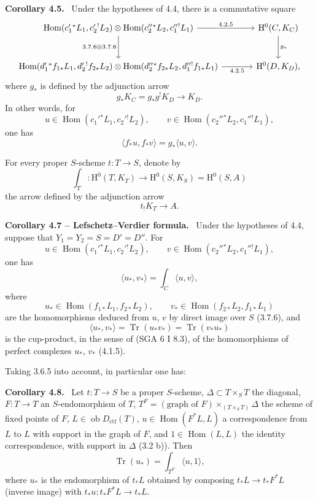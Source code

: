 \documentclass[11pt]{article}
\newenvironment{statement}[1]{\par\medskip\noindent\textbf{#1.}\ }{\par\medskip}
\renewcommand{\H}{\mathrm{H}}
\DeclareMathOperator{\Hom}{Hom}
\newcommand{\ob}{\operatorname{ob}}
\providecommand{\Dctf}{D_{\mathrm{ctf}}}
\providecommand{\Tr}{\operatorname{Tr}}
\providecommand{\Tr}{\operatorname{Tr}}
\providecommand{\Dctf}{D_{\mathrm{ctf}}}
\providecommand{\Tr}{\operatorname{Tr}}
\providecommand{\Hom}{\operatorname{Hom}}
\providecommand{\ob}{\operatorname{ob}}
\providecommand{\Tr}{\operatorname{Tr}}
\providecommand{\Hom}{\operatorname{Hom}}
\providecommand{\Tr}{\operatorname{Tr}}
\begin{document}
\begin{statement}{Corollary 4.5}
Under the hypotheses of 4.4, there is a commutative square
\[
\begin{tikzcd}[column sep=large,row sep=large]
\Hom(c_1'{}^*L_1,c_2'{}^!L_2)\otimes
\Hom(c_2''{}^*L_2,c_1''{}^!L_1)
 \arrow[r,"4.2.5"] \arrow[d,"3.7.6\otimes 3.7.6"'] &
\H^0(C,K_C)\arrow[d,"g_*"]\\
\Hom(d_1'{}^*f_{1*}L_1,d_2'{}^!f_{2*}L_2)\otimes
\Hom(d_2''{}^*f_{2*}L_2,d_1''{}^!f_{1*}L_1)
 \arrow[r,"4.2.5"'] &
\H^0(D,K_D),
\end{tikzcd}
\]
where $g_*$ is defined by the adjunction arrow
\[
g_*K_C=g_*g^!K_D\longrightarrow K_D.
\]
In other words, for
\[
u\in\Hom(c_1'{}^*L_1,c_2'{}^!L_2),\qquad
v\in\Hom(c_2''{}^*L_2,c_1''{}^!L_1),
\]
one has
\begin{equation}
\tag{4.5.1}
\langle f_*u,f_*v\rangle=g_*\langle u,v\rangle.
\end{equation}
\end{statement}

For every proper $S$-scheme $t:T\longrightarrow S$, denote by
\begin{equation}
\tag{4.6}
\int_T:\H^0(T,K_T)\longrightarrow \H^0(S,K_S)=\H^0(S,A)
\end{equation}
the arrow defined by the adjunction arrow
\[
t_!K_T\longrightarrow A.
\]

\begin{statement}{Corollary 4.7 -- Lefschetz--Verdier formula}
Under the hypotheses of 4.4, suppose that $Y_1=Y_2=S=D'=D''$. For
\[
u\in\Hom(c_1'{}^*L_1,c_2'{}^!L_2),\qquad
v\in\Hom(c_2''{}^*L_2,c_1''{}^!L_1),
\]
one has
\begin{equation}
\tag{4.7.1}
\langle u_*,v_*\rangle=\int_C\langle u,v\rangle,
\end{equation}
where
\[
u_*\in\Hom(f_{1*}L_1,f_{2*}L_2),\qquad
v_*\in\Hom(f_{2*}L_2,f_{1*}L_1)
\]
are the homomorphisms deduced from $u$, $v$ by direct image over $S$ (3.7.6), and
\[
\langle u_*,v_*\rangle=\Tr(u_*v_*)=\Tr(v_*u_*)
\]
is the cup-product, in the sense of (SGA 6 I 8.3), of the homomorphisms of perfect complexes $u_*$, $v_*$ (4.1.5).
\end{statement}

Taking 3.6.5 into account, in particular one has:

\begin{statement}{Corollary 4.8}
Let $t:T\longrightarrow S$ be a proper $S$-scheme, $\Delta\subset T\times_S T$ the diagonal, $F:T\longrightarrow T$ an $S$-endomorphism of $T$, $T^F=(\text{graph of }F)\times_{(T\times_S T)}\Delta$ the scheme of fixed points of $F$, $L\in\ob\Dctf(T)$, $u\in\Hom(F^*L,L)$ a correspondence from $L$ to $L$ with support in the graph of $F$, and $1\in\Hom(L,L)$ the identity correspondence, with support in $\Delta$ (3.2 b)). Then
\[
\Tr(u_*)=\int_{T^F}\langle u,1\rangle,
\]
where $u_*$ is the endomorphism of $t_*L$ obtained by composing $t_*L\longrightarrow t_*F^*L$ (inverse image) with $t_*u:t_*F^*L\longrightarrow t_*L$.
\end{statement}
\end{document}
